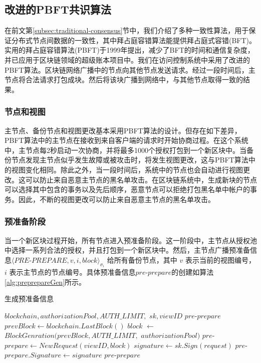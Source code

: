 \subsection{改进的PBFT共识算法}

在前文第\ref{subsec:traditional-consensus}节中，我们介绍了多种一致性算法，用于保证分布式节点间数据的一致性，其中拜占庭容错算法能提供拜占庭式容错(BFT)。实用的拜占庭容错算法(PBFT)于1999年提出，减少了BFT的时间和通信复杂度，并已应用于区块链领域的超级账本项目中。我们在访问控制系统中采用了改进的PBFT算法。区块链网络广播中的节点向其他节点发送请求。经过一段时间后，主节点将合法请求打包成块。然后将该块广播到网络中，与其他节点取得一致的结果。

\subsubsection{节点和视图}

主节点、备份节点和视图更改基本采用PBFT算法的设计。但存在如下差异，PBFT算法中的主节点在接收到来自客户端的请求时开始协商过程。在这个系统中，主节点每2秒启动一次协商，并将最多1000个授权打包到一个新区块中。当备份节点发现主节点似乎发生故障或被攻击时，将发生视图更改，这与PBFT算法中的视图变化相同。除此之外，当一段时间后，系统中的节点也会自动进行视图更改。这可以防止来自恶意主节点的黑名单攻击。在区块链系统中，生成新块的节点可以选择其中包含的事务以及先后顺序，恶意节点可以拒绝打包黑名单中帐户的事务。因此，不断的视图更改可以防止来自恶意主节点的黑名单攻击。

\subsubsection{预准备阶段}

当一个新区块过程开始，所有节点进入预准备阶段。这一阶段中，主节点从授权池中选择一系列合法的授权，并且打包到一个新区块中。然后，主节点广播预准备信息$\langle PRE$-$PREPARE, v, i, block \rangle_{\sigma_{i}}$ 给所有备份节点，其中 $v$ 表示当前的视图编号，$i$ 表示主节点的节点编号。具体预准备信息$pre$-$prepare$的创建如算法\ref{alg:preprepareGen}所示。

 \begin{algorithm}
 \caption{生成预准备信息}\label{alg:preprepareGen}
   \begin{algorithmic}[H]
   \renewcommand{\algorithmicrequire}{\textbf{Input:}}
   \renewcommand{\algorithmicensure}{\textbf{Output:}}
   \REQUIRE $blockchain, authorizationPool, AUTH\_LIMIT,$ $sk, viewID$
   \ENSURE  $pre$-$prepare$
    \STATE $prevBlock \gets blockchain.LastBlock()$
    \STATE $block$ $\gets$ $BlockGenration(prevBlock, AUTH\_LIMIT,$ $authorizationPool)$
    \STATE $pre$-$prepare \gets NewRequest(viewID, block)$
    \STATE $signature \gets sk.Sign(request)$
    \STATE $pre$-$prepare.Signature \gets signature$
   \RETURN $pre$-$prepare$
   \end{algorithmic}
 \end{algorithm}


